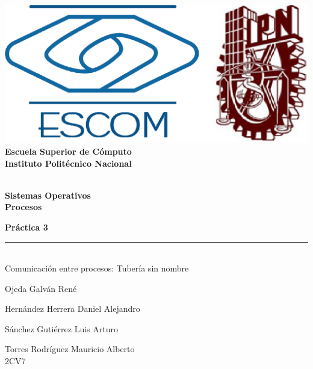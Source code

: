 
\begin{titlepage} %

    \begin{flushright}

	   \includegraphics[scale=0.15]{imagenes/escom-ipn.png}
	   \large \textbf{\\Escuela Superior de C\'omputo}
	   \large \textbf{\\Instituto Polit\'ecnico Nacional }%

	   \vspace{2.5cm} %

	   \large \textbf{\\Sistemas Operativos}%
	   \large \textbf{\\Procesos}%

	   \vspace{1.2cm} %

	   \large \textbf{Pr\'actica 3}\\%
	   \rule{9cm}{3pt} %
	   \large{\\ Comunicación entre procesos: Tubería sin nombre} %

	   \vspace{2.5cm} %

		\item Ojeda Galván René
		\item Hernández Herrera Daniel Alejandro
	    \item Sánchez Gutiérrez Luis Arturo
	  \item Torres Rodríguez Mauricio Alberto \\ %
	   2CV7 %

	   \vspace{2.5cm} %

	   \date{\today}

    \end{flushright}

\end{titlepage}
